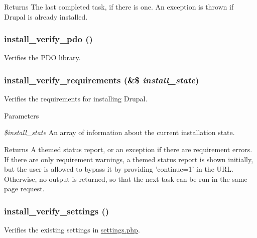 \begin{DoxyReturn}{Returns}
The last completed task, if there is one. An exception is thrown if Drupal is already installed. 
\end{DoxyReturn}
\hypertarget{install_8core_8inc_a05cc52656e3a172f087a5043eb00087a}{
\subsubsection[{install\_\-verify\_\-pdo}]{\setlength{\rightskip}{0pt plus 5cm}install\_\-verify\_\-pdo ()}}
\label{install_8core_8inc_a05cc52656e3a172f087a5043eb00087a}
Verifies the PDO library. \hypertarget{install_8core_8inc_a6cd2658e0f95bd0d5ce8942aa5884124}{
\subsubsection[{install\_\-verify\_\-requirements}]{\setlength{\rightskip}{0pt plus 5cm}install\_\-verify\_\-requirements (\&\$ {\em install\_\-state})}}
\label{install_8core_8inc_a6cd2658e0f95bd0d5ce8942aa5884124}
Verifies the requirements for installing Drupal.


\begin{DoxyParams}{Parameters}
\item[{\em \$install\_\-state}]An array of information about the current installation state.\end{DoxyParams}
\begin{DoxyReturn}{Returns}
A themed status report, or an exception if there are requirement errors. If there are only requirement warnings, a themed status report is shown initially, but the user is allowed to bypass it by providing 'continue=1' in the URL. Otherwise, no output is returned, so that the next task can be run in the same page request. 
\end{DoxyReturn}
\hypertarget{install_8core_8inc_ab9be391a3ce3d42b0a75b2abe95b5232}{
\subsubsection[{install\_\-verify\_\-settings}]{\setlength{\rightskip}{0pt plus 5cm}install\_\-verify\_\-settings ()}}
\label{install_8core_8inc_ab9be391a3ce3d42b0a75b2abe95b5232}
Verifies the existing settings in \hyperlink{settings_8php}{settings.php}. 
